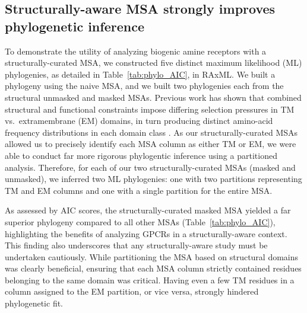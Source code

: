 \documentclass[fleqn,10pt]{wlpeerj}
\begin{document}
\subsection*{Structurally-aware MSA strongly improves phylogenetic inference}

To demonstrate the utility of analyzing biogenic amine receptors with a structurally-curated MSA, we constructed five distinct maximum likelihood (ML) phylogenies, as detailed in Table~\ref{tab:phylo_AIC}, in RAxML. We built a phylogeny using the naive MSA, and we built two phylogenies each from the structural unmasked and masked MSAs. Previous work has shown that combined structural and functional constraints impose differing selection pressures in TM vs.\ extramembrane (EM) domains, in turn producing distinct amino-acid frequency distributions in each domain class \citep{Tourasse2000,Stevens2001,Julenius2006,Oberai2009,SpielmanWilke2013,FranzosaXueXia2013}. As our structurally-curated MSAs allowed us to precisely identify each MSA column as either TM or EM, we were able to conduct far more rigorous phylogentic inference using a partitioned analysis. Therefore, for each of our two structurally-curated MSAs (masked and unmasked), we inferred two ML phylogenies: one with two partitions representing TM and EM columns and one with a single partition for the entire MSA. 

As assessed by AIC scores, the structurally-curated masked MSA yielded a far superior phylogeny compared to all other MSAs (Table~\ref{tab:phylo_AIC}), highlighting the benefits of analyzing GPCRs in a structurally-aware context. This finding also underscores that any structurally-aware study must be undertaken cautiously. While partitioning the MSA based on structural domains was clearly beneficial, ensuring that each MSA column strictly contained residues belonging to the same domain was critical. Having even a few TM residues in a column assigned to the EM partition, or vice versa, strongly hindered phylogenetic fit.
\end{document}
